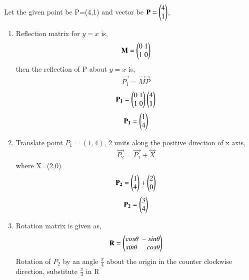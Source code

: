 \documentclass[journal]{IEEEtran}
\begin{document}
         \solution \\
         Let the given point be P=(4,1) and vector be $\mathbf{P}=\begin{pmatrix}4\\1\end{pmatrix}$,
         \begin{enumerate}[label=(\alph*)]
             \item Reflection matrix for $y=x$ is,
             \begin{align}
                 \mathbf{M}=\begin{pmatrix}0\;1\\1\;0\end{pmatrix}
             \end{align}
             then the reflection of P about $y=x$ is,
             \begin{align}
                 \vec{P_1}=\vec{M}\vec{P}
             \end{align}
             \begin{align}
                 \mathbf{P_1}=\begin{pmatrix}0\;1\\1\;0\end{pmatrix}\begin{pmatrix}4\\1\end{pmatrix}
             \end{align}
             \begin{align}
                 \mathbf{P_1}=\begin{pmatrix}1\\4\end{pmatrix}
             \end{align}
             \item Translate point $P_1=(1,4)$, 2 units along the positive direction of x axis,
             \begin{align}
                 \vec{P_2} = \vec{P_1} + \vec{X}
             \end{align}
             where X=(2,0)
             \begin{align}
                 \mathbf{P_2} = \begin{pmatrix}1\\4\end{pmatrix}+\begin{pmatrix}2\\0\end{pmatrix}
             \end{align}
             \begin{align}
                 \mathbf{P_2} = \begin{pmatrix}3\\4\end{pmatrix}
             \end{align}
             \item Rotation matrix is given as,
             \begin{align}
                 \mathbf{R}=\begin{pmatrix}cos\theta\;-sin\theta\\sin\theta\;\;\;\;\;cos\theta\end{pmatrix}
             \end{align}
             Rotation of $P_2$ by an angle $\frac{\pi}{4}$ about the origin in the counter clockwise direction, substitute $\frac{\pi}{4}$ in R
             \begin{align}

\end{align}
\end{enumerate}
\end{document}
